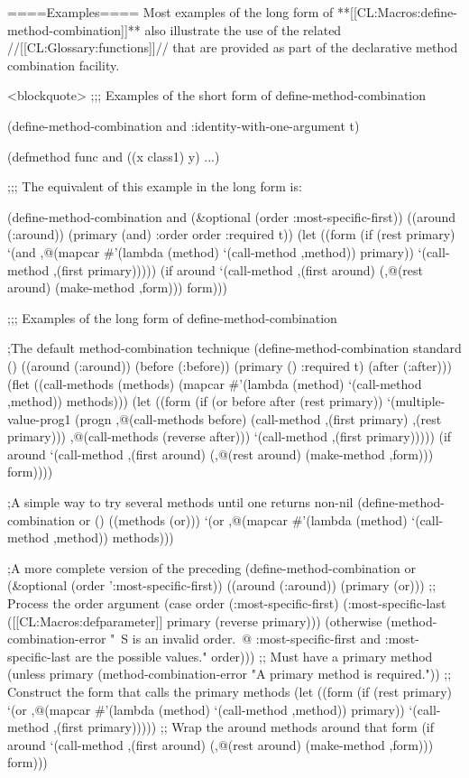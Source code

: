====Examples====
Most examples of the long form of **[[CL:Macros:define-method-combination]]** also illustrate the use of the related //[[CL:Glossary:functions]]// that are provided as part of the declarative method combination facility.

<blockquote> ;;; Examples of the short form of define-method-combination

(define-method-combination and :identity-with-one-argument t)

(defmethod func and ((x class1) y) ...)

;;; The equivalent of this example in the long form is:

(define-method-combination and (&optional (order :most-specific-first)) ((around (:around)) (primary (and) :order order :required t)) (let ((form (if (rest primary) `(and ,@(mapcar #'(lambda (method) `(call-method ,method)) primary)) `(call-method ,(first primary))))) (if around `(call-method ,(first around) (,@(rest around) (make-method ,form))) form)))

;;; Examples of the long form of define-method-combination

;The default method-combination technique (define-method-combination standard () ((around (:around)) (before (:before)) (primary () :required t) (after (:after))) (flet ((call-methods (methods) (mapcar #'(lambda (method) `(call-method ,method)) methods))) (let ((form (if (or before after (rest primary)) `(multiple-value-prog1 (progn ,@(call-methods before) (call-method ,(first primary) ,(rest primary))) ,@(call-methods (reverse after))) `(call-method ,(first primary))))) (if around `(call-method ,(first around) (,@(rest around) (make-method ,form))) form))))

;A simple way to try several methods until one returns non-nil (define-method-combination or () ((methods (or))) `(or ,@(mapcar #'(lambda (method) `(call-method ,method)) methods)))

;A more complete version of the preceding (define-method-combination or (&optional (order ':most-specific-first)) ((around (:around)) (primary (or))) ;; Process the order argument (case order (:most-specific-first) (:most-specific-last ([[CL:Macros:defparameter]] primary (reverse primary))) (otherwise (method-combination-error "~S is an invalid order.~@ :most-specific-first and :most-specific-last are the possible values." order))) ;; Must have a primary method (unless primary (method-combination-error "A primary method is required.")) ;; Construct the form that calls the primary methods (let ((form (if (rest primary) `(or ,@(mapcar #'(lambda (method) `(call-method ,method)) primary)) `(call-method ,(first primary))))) ;; Wrap the around methods around that form (if around `(call-method ,(first around) (,@(rest around) (make-method ,form))) form)))

